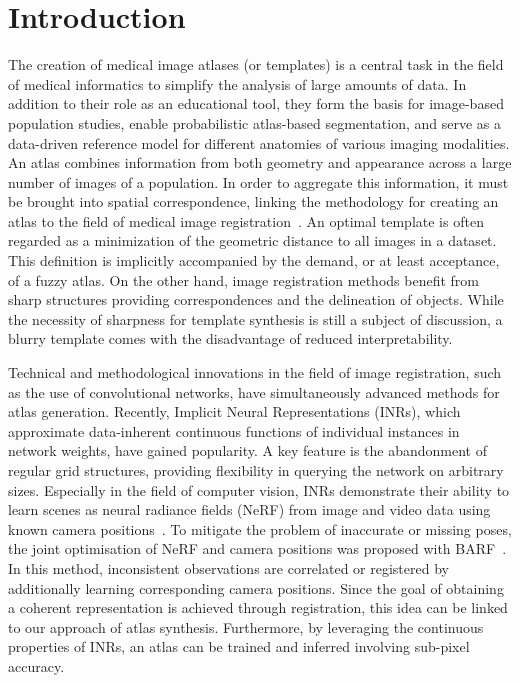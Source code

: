 \section{Introduction}
The creation of medical image atlases (or templates) is a central task in the field of medical informatics to simplify the analysis of large amounts of data. In addition to their role as an educational tool, they form the basis for image-based population studies, enable probabilistic atlas-based segmentation, and serve as a data-driven reference model for different anatomies of various imaging modalities. An atlas combines information from both geometry and appearance across a large number of images of a population. In order to aggregate this information, it must be brought into spatial correspondence, linking the methodology for creating an atlas to the field of medical image registration~\cite{Joshi2004UnbiasedDA}. An optimal template is often regarded as a minimization of the geometric distance to all images in a dataset. This definition is implicitly accompanied by the demand, or at least acceptance, of a fuzzy atlas. On the other hand, image registration methods benefit from sharp structures providing correspondences and the delineation of objects. While the necessity of sharpness for template synthesis is still a subject of discussion, a blurry template comes with the disadvantage of reduced interpretability. 

Technical and methodological innovations in the field of image registration, such as the use of convolutional networks, have simultaneously advanced methods for atlas generation. Recently, Implicit Neural Representations (INRs), which approximate data-inherent continuous functions of individual instances in network weights, have gained popularity. A key feature is the abandonment of regular grid structures, providing flexibility in querying the network on arbitrary sizes. Especially in the field of computer vision, INRs demonstrate their ability to learn scenes as neural radiance fields (NeRF) from image and video data using known camera positions~\cite{mildenhall2021nerf}.  To mitigate the problem of inaccurate or missing poses, the joint optimisation of NeRF and camera positions was proposed with BARF~\cite{lin2021barf}. In this method, inconsistent observations are correlated or registered by additionally learning corresponding camera positions. Since the goal of obtaining a coherent representation is achieved through registration, this idea can be linked to our approach of atlas synthesis. Furthermore, by leveraging the continuous properties of INRs, an atlas can be trained and inferred involving sub-pixel accuracy.

